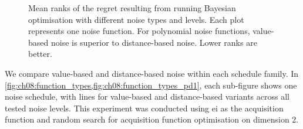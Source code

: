 \begin{figure}[!htbp]
\begin{subfigure}{\textwidth}
    \end{subfigure}
\caption[Noise type and level comparison on ]{Mean ranks of the regret resulting from running Bayesian optimisation with different noise types and levels. Each plot represents one noise function. For polynomial noise functions, value-based noise is superior to distance-based noise. Lower ranks are better.}
\label{fig:ch08:function_types}
\end{figure}

We compare value-based and distance-based noise within each schedule family. In \cref{fig:ch08:function_types,fig:ch08:function_types_pd1}, each sub-figure shows one noise schedule, with lines for value-based and distance-based variants across all tested noise levels. This experiment was conducted using \gls{ei} as the acquisition function and random search for acquisition function optimisation on dimension 2.

